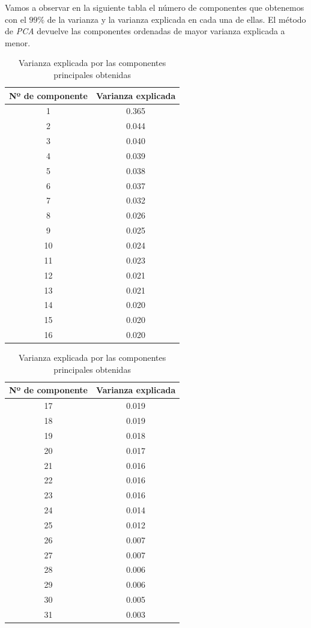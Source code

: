 \documentclass[11pt]{article}
\begin{document}
Vamos a observar en la siguiente tabla el número de componentes que obtenemos con el $99\%$ de la varianza y la varianza explicada en cada una de ellas. El método de \emph{PCA} devuelve las componentes ordenadas de mayor varianza explicada a menor.

\begin{table}[!htb]
  \begin{tabular}{|c|c|}
    \hline
    \textbf{Nº de componente}  &         \textbf{Varianza explicada} \\
    \hline
    1& 0.365 \\
    2& 0.044\\
    3& 0.040\\
    4& 0.039\\
    5& 0.038\\
    6& 0.037\\
    7& 0.032\\
    8& 0.026\\
    9& 0.025 \\
    10& 0.024\\
    11& 0.023\\
    12& 0.021\\
    13& 0.021\\
    14& 0.020\\
    15& 0.020\\
    16& 0.020\\
    \hline
  \end{tabular}
  \quad
  \begin{tabular}{|c|c|}
    \hline
    \textbf{Nº de componente}  &         \textbf{Varianza explicada} \\
    \hline
    17& 0.019\\
    18& 0.019\\
    19& 0.018\\
    20& 0.017\\
    21& 0.016\\
    22& 0.016\\
    23& 0.016\\
    24& 0.014\\
    25& 0.012\\
    26& 0.007\\
    27& 0.007\\
    28& 0.006\\
    29& 0.006\\
    30& 0.005\\
    31& 0.003\\
    \hline
  \end{tabular}
\caption{Varianza explicada por las componentes principales obtenidas}
\end{table}
\end{document}
